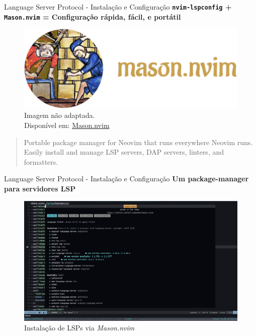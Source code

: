 \begin{frame}{Language Server Protocol - Instalação e Configuração}
  \textbf{\texttt{nvim-lspconfig} + \texttt{Mason.nvim} = Configuração rápida, fácil, e portátil}
  \begin{figure}
      \centering
      \includegraphics[height=0.3\linewidth]{Image/Mason-Logo.png}
      \label{mason-logo}
      \footnotesize
      \\ Imagem não adaptada. \\
      Disponível em:  \hyperlink{https://github.com/williamboman/mason.nvim}{Mason.nvim}
  \end{figure}
  \begin{quotation} \small
    Portable package manager for Neovim that runs everywhere Neovim runs. Easily install and manage LSP servers, DAP
    servers, linters, and formatters.\cite{mason-nvim}
  \end{quotation}
\end{frame}

\begin{frame}{Language Server Protocol - Instalação e Configuração}
  \textbf{Um package-manager para servidores LSP}
  \begin{figure}
      \centering
      \includegraphics[height=0.5\linewidth]{Image/MasonLSP.png}
      \label{neovim-logo-2}
      \footnotesize
      \\ Instalação de LSPs via \textit{Mason.nvim} \\
  \end{figure}
\end{frame}


